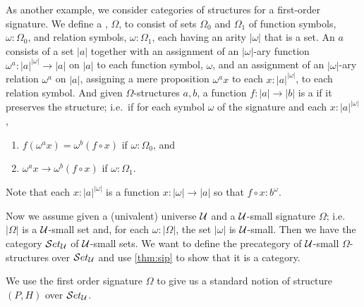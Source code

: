 As another example, we consider categories of structures for a first-order signature.
We define a ,
%
%
$\Omega$, to consist of sets $\Omega_0$ and $\Omega_1$ of function symbols, $\omega:\Omega_0$, and relation symbols, $\omega:\Omega_1$, each having an arity $|\omega|$ that is a set.
An 
%
%
$a$ consists of a set $|a|$ together with an assignment of an $|\omega|$-ary function $\omega^a:|a|^{|\omega|}\to |a|$ on $|a|$ to each function symbol, $\omega$, and an assignment of an $|\omega|$-ary relation $\omega^a$ on $|a|$, assigning a mere proposition $\omega^ax$ to each $x:|a|^{|\omega|}$, to each relation symbol.
And given $\Omega$-structures $a,b$, a function $f:|a|\to |b|$ is a 
%
%
if it preserves the structure; i.e.\ if for each symbol $\omega$ of the signature and each $x:|a|^{|\omega|}$,
\begin{enumerate}
\item $f(\omega^ax) = \omega^b(f\circ x)$ if $\omega:\Omega_0$, and
\item $\omega^ax\to\omega^b(f\circ x)$ if $\omega:\Omega_1$.
\end{enumerate}
Note that each $x:|a|^{|\omega|}$ is a function $x:|\omega|\to |a|$ so that $f\circ x : b^\omega$.

Now we assume given a (univalent) universe $\mathcal{U}$ and a $\mathcal{U}$-small signature $\Omega$; i.e. $|\Omega|$ is a $\mathcal{U}$-small set and, for each $\omega:|\Omega|$, the set $|\omega|$ is $\mathcal{U}$-small.
Then we have the category $\mathcal{S}et_\mathcal{U}$ of $\mathcal{U}$-small sets.  We want to define the precategory of $\mathcal{U}$-small $\Omega$-structures over $\mathcal{S}et_\mathcal{U}$ and use \cref{thm:sip} to show that it is a category.

We use the first order signature $\Omega$ to give us a standard notion of structure $(P,H)$ over $\mathcal{S}et_\mathcal{U}$.

